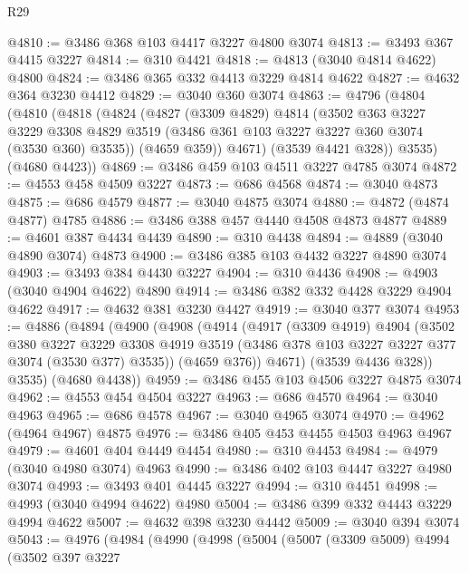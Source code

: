 \begin{lexlean}{R29}
\begin{coremodule}
@4810 := @3486 @368 @103 @4417 @3227 @4800 @3074
@4813 := @3493 @367 @4415 @3227
@4814 := @310 @4421
@4818 := @4813 (@3040 @4814 @4622) @4800
@4824 := @3486 @365 @332 @4413 @3229 @4814 @4622
@4827 := @4632 @364 @3230 @4412
@4829 := @3040 @360 @3074
@4863 := @4796
    (@4804
      (@4810
        (@4818
          (@4824
            (@4827
              (@3309 @4829)
              @4814
              (@3502
                @363
                @3227
                @3229
                @3308
                @4829
                @3519
                (@3486 @361 @103 @3227 @3227 @360 @3074 (@3530 @360) @3535))
              (@4659 @359))
            @4671)
          (@3539 @4421 @328))
        @3535)
      (@4680 @4423))
@4869 := @3486 @459 @103 @4511 @3227 @4785 @3074
@4872 := @4553 @458 @4509 @3227
@4873 := @686 @4568
@4874 := @3040 @4873
@4875 := @686 @4579
@4877 := @3040 @4875 @3074
@4880 := @4872 (@4874 @4877) @4785
@4886 := @3486 @388 @457 @4440 @4508 @4873 @4877
@4889 := @4601 @387 @4434 @4439
@4890 := @310 @4438
@4894 := @4889 (@3040 @4890 @3074) @4873
@4900 := @3486 @385 @103 @4432 @3227 @4890 @3074
@4903 := @3493 @384 @4430 @3227
@4904 := @310 @4436
@4908 := @4903 (@3040 @4904 @4622) @4890
@4914 := @3486 @382 @332 @4428 @3229 @4904 @4622
@4917 := @4632 @381 @3230 @4427
@4919 := @3040 @377 @3074
@4953 := @4886
    (@4894
      (@4900
        (@4908
          (@4914
            (@4917
              (@3309 @4919)
              @4904
              (@3502
                @380
                @3227
                @3229
                @3308
                @4919
                @3519
                (@3486 @378 @103 @3227 @3227 @377 @3074 (@3530 @377) @3535))
              (@4659 @376))
            @4671)
          (@3539 @4436 @328))
        @3535)
      (@4680 @4438))
@4959 := @3486 @455 @103 @4506 @3227 @4875 @3074
@4962 := @4553 @454 @4504 @3227
@4963 := @686 @4570
@4964 := @3040 @4963
@4965 := @686 @4578
@4967 := @3040 @4965 @3074
@4970 := @4962 (@4964 @4967) @4875
@4976 := @3486 @405 @453 @4455 @4503 @4963 @4967
@4979 := @4601 @404 @4449 @4454
@4980 := @310 @4453
@4984 := @4979 (@3040 @4980 @3074) @4963
@4990 := @3486 @402 @103 @4447 @3227 @4980 @3074
@4993 := @3493 @401 @4445 @3227
@4994 := @310 @4451
@4998 := @4993 (@3040 @4994 @4622) @4980
@5004 := @3486 @399 @332 @4443 @3229 @4994 @4622
@5007 := @4632 @398 @3230 @4442
@5009 := @3040 @394 @3074
@5043 := @4976
    (@4984
      (@4990
        (@4998
          (@5004
            (@5007
              (@3309 @5009)
              @4994
              (@3502
                @397
                @3227

\end{coremodule}
\end{lexlean}
